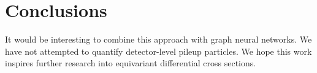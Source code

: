 \section{Conclusions}\label{sec:conclusions}

It would be interesting to combine this approach with graph neural
networks. We have not attempted to quantify detector-level pileup
particles. We hope this work inspires further research into equivariant
differential cross sections.

